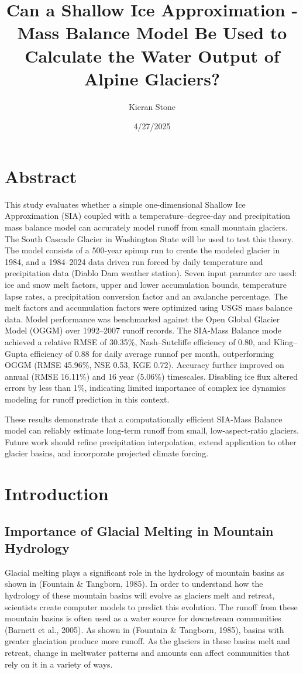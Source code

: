 \documentclass{article}
\title{Can a Shallow Ice Approximation - Mass Balance Model Be Used to Calculate the Water Output of Alpine Glaciers?}
\author{Kieran Stone}
\date{4/27/2025}
\begin{document}
\maketitle

\section*{Abstract}
This study evaluates whether a simple one-dimensional Shallow Ice Approximation (SIA) coupled with a temperature–degree-day and precipitation mass balance model can 
accurately model runoff from small mountain glaciers. The South Cascade Glacier in Washington State will be used to test this theory. The model consists of a 
500-year spinup run to create the modeled glacier in 1984, and a 1984–2024 data driven run forced by daily temperature and precipitation 
data (Diablo Dam weather station). Seven input paramter are used: ice and 
snow melt factors, upper and lower accumulation bounds, temperature lapse rates, a precipitation conversion factor and an avalanche percentage. The melt factors and accumulation factors were optimized using USGS mass balance data. 
Model performance was benchmarked against the Open Global Glacier Model (OGGM) over 1992–2007 runoff records. The SIA-Mass Balance mode 
achieved a relative RMSE of 30.35\%, Nash–Sutcliffe efficiency of 0.80, and Kling–Gupta efficiency of 0.88 for daily average runnof per month, outperforming OGGM 
(RMSE 45.96\%, NSE 0.53, KGE 0.72). Accuracy further improved on annual (RMSE 16.11\%) and 16 year (5.06\%) timescales. Disabling ice flux altered 
errors by less than 1\%, indicating limited importance of complex ice dynamics modeling for runoff prediction in this context.

These results demonstrate that a computationally efficient SIA-Mass Balance model can reliably estimate long-term runoff from small, low-aspect-ratio 
glaciers. Future work should refine precipitation 
interpolation, extend application to other glacier basins, and incorporate projected climate forcing.
\newpage
\section{Introduction}
\subsection{Importance of Glacial Melting in Mountain Hydrology}
Glacial melting plays a significant role in the hydrology of mountain basins as shown in (Fountain \& Tangborn, 1985). In order to 
understand how the hydrology of these mountain basins will evolve as glaciers melt and retreat, scientists create computer models to predict 
this evolution. The runoff from these mountain basins is often used as a water source for downstream communities (Barnett et al., 2005). As shown in 
(Fountain \& Tangborn, 1985), basins with greater glaciation produce more runoff. As the glaciers in these basins melt and retreat, 
change in meltwater patterns and amounts can affect communities that rely on it in a variety of ways.
\end{document}
